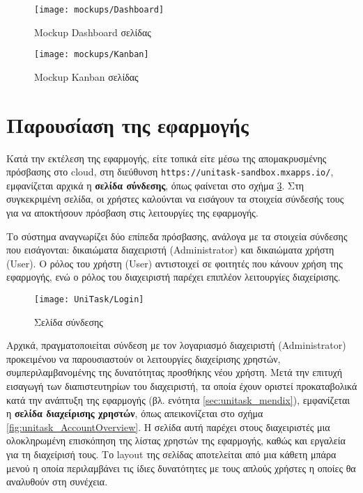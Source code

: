         \begin{figure}[p!] \noindent \centering
            \texttt{[image: mockups/Dashboard]}
            \caption{\centering Mockup Dashboard σελίδας}
            \label{fig:unitaskMockupDashboard}
        \end{figure}

        \begin{figure}[p!] \noindent \centering
            \texttt{[image: mockups/Kanban]}
            \caption{\centering Mockup Kanban σελίδας}
            \label{fig:unitaskMockupKanban}
        \end{figure}

    \pagebreak

    \section{Παρουσίαση της εφαρμογής}
        Κατά την εκτέλεση της εφαρμογής, είτε τοπικά είτε μέσω της απομακρυσμένης πρόσβασης στο cloud, στη διεύθυνση \texttt{https://unitask-sandbox.mxapps.io/}, εμφανίζεται αρχικά η \textbf{σελίδα σύνδεσης}, όπως φαίνεται στο σχήμα \ref{fig:unitask_Login}. Στη συγκεκριμένη σελίδα, οι χρήστες καλούνται να εισάγουν τα στοιχεία σύνδεσής τους για να αποκτήσουν πρόσβαση στις λειτουργίες της εφαρμογής.

        Το σύστημα αναγνωρίζει δύο επίπεδα πρόσβασης, ανάλογα με τα στοιχεία σύνδεσης που εισάγονται: δικαιώματα διαχειριστή (Administrator) και δικαιώματα χρήστη (User). Ο ρόλος του χρήστη (User) αντιστοιχεί σε φοιτητές που κάνουν χρήση της εφαρμογής, ενώ ο ρόλος του διαχειριστή παρέχει επιπλέον λειτουργίες διαχείρισης.

       \begin{figure}[h!] \noindent \centering
            \texttt{[image: UniTask/Login]}
            \caption{\centering Σελίδα σύνδεσης}
            \label{fig:unitask_Login}
        \end{figure}

        Αρχικά, πραγματοποιείται σύνδεση με τον λογαριασμό διαχειριστή (Administrator) προκειμένου να παρουσιαστούν οι λειτουργίες διαχείρισης χρηστών, συμπεριλαμβανομένης της δυνατότητας προσθήκης νέου χρήστη. Μετά την επιτυχή εισαγωγή των διαπιστευτηρίων του διαχειριστή, τα οποία έχουν οριστεί προκαταβολικά κατά την ανάπτυξη της εφαρμογής (βλ. ενότητα \ref{sec:unitask_mendix}), εμφανίζεται η \textbf{σελίδα διαχείρισης χρηστών}, όπως απεικονίζεται στο σχήμα \ref{fig:unitask_AccountOverview}. Η σελίδα αυτή παρέχει στους διαχειριστές μια ολοκληρωμένη επισκόπηση της λίστας χρηστών της εφαρμογής, καθώς και εργαλεία για τη διαχείρισή τους. Το layout της σελίδας αποτελείται από μια κάθετη μπάρα μενού η οποία περιλαμβάνει τις ίδιες δυνατότητες με τους απλούς χρήστες η οποίες θα αναλυθούν στη συνέχεια.

